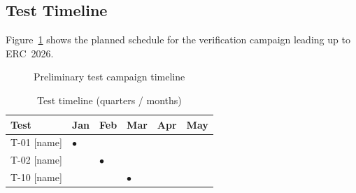 \subsection{Test Timeline}
\label{subsec:tp_timeline}

Figure~\ref{fig:test_timeline} shows the planned schedule for the
verification campaign leading up to ERC~2026.

\begin{figure}[H]
    \centering
    \caption{Preliminary test campaign timeline}
    \label{fig:test_timeline}
\end{figure}

\begin{table}[H]
    \centering
    \caption{Test timeline (quarters / months)}
    \label{tab:test_timeline}
    \begin{tabular}{L{3cm} C{1.5cm} C{1.5cm} C{1.5cm} C{1.5cm} C{1.5cm}}
        \toprule
        \textbf{Test}   & \textbf{Jan} & \textbf{Feb} & \textbf{Mar}
                        & \textbf{Apr} & \textbf{May} \\
        \midrule
        T-01 [name]     & $\bullet$    &              &  &  & \\
        T-02 [name]     &              & $\bullet$    &  &  & \\
        T-10 [name]     &              &              & $\bullet$ &  & \\
        \bottomrule
    \end{tabular}
\end{table}

